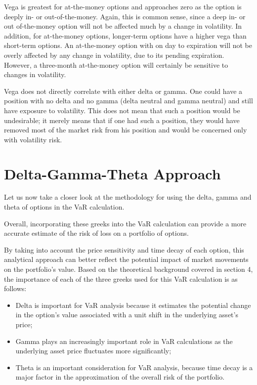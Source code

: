 \documentclass[a4paper, 12pt]{article}
\theoremstyle{definition}
\theoremstyle{plain}
\theoremstyle{definition}
\begin{document}
Vega is greatest for at-the-money options and approaches zero as the option is
deeply in- or out-of-the-money. Again, this is common sense, since a deep in- or out
of-the-money option will not be affected much by a change in volatility. In addition,
for at-the-money options, longer-term options have a higher vega than short-term
options. An at-the-money option with on
day to expiration will not be overly affected by any change in volatility, due to its
pending expiration. However, a three-month at-the-money option will certainly be
sensitive to changes in volatility.

Vega does not directly correlate with either delta or gamma. One could have a
position with no delta and no gamma (delta neutral and gamma neutral) and still have
exposure to volatility. This does not mean that such a position would be undesirable;
it merely means that if one had such a position, they would have removed most of the
market risk from his position and would be concerned only with volatility risk. 

\section{Delta-Gamma-Theta Approach}

Let us now take a closer look 
at the methodology for using  
the delta, gamma and theta of 
options in the VaR calculation. 

Overall, incorporating these greeks into the VaR calculation 
can provide a more accurate estimate of the risk of 
loss on a portfolio of options.

By taking into account the price sensitivity and time 
decay of each option, this analytical approach can better 
reflect the potential impact of market movements on 
the portfolio's value. Based on the theoretical 
background covered in section 4, the importance of 
each of the three greeks used for this VaR calculation is as follows:

\begin{itemize}
    \item Delta is important for VaR analysis 
    because it estimates the potential change 
    in the option's value associated with a 
    unit shift in the underlying asset's price;
    \item Gamma plays an increasingly important role in 
    VaR calculations as the underlying asset price 
    fluctuates more significantly;
    \item Theta is an important consideration for VaR 
    analysis, because time decay is a major factor
    in the approximation of the overall risk of the portfolio.
\end{itemize}
\end{document}
